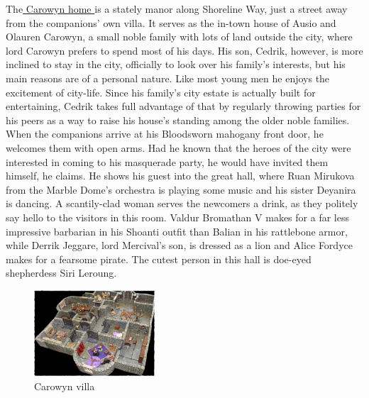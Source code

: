 The\hyperref[fig:Carowyn-villa-486295633]{ Carowyn home } is a stately manor along Shoreline Way, just a street away from the companions' own villa. It serves as the in-town house of Ausio and Olauren Carowyn, a small noble family with lots of land outside the city, where lord Carowyn prefers to spend most of his days. His son, Cedrik, however, is more inclined to stay in the city, officially to look over his family's interests, but his main reasons are of a personal nature. Like most young men he enjoys the excitement of city-life. Since his family's city estate is actually built for entertaining, Cedrik takes full advantage of that by regularly throwing parties for his peers as a way to raise his house's standing among the older noble families. When the companions arrive at his Bloodsworn mahogany front door, he welcomes them with open arms. Had he known that the heroes of the city were interested in coming to his masquerade party, he would have invited them himself, he claims. He shows his guest into the great hall, where Ruan Mirukova from the Marble Dome's orchestra is playing some music and his sister Deyanira is dancing. A scantily-clad woman serves the newcomers a drink, as they politely say hello to the visitors in this room. Valdur Bromathan V makes for a far less impressive barbarian in his Shoanti outfit than Balian in his rattlebone armor, while Derrik Jeggare, lord Mercival's son, is dressed as a lion and Alice Fordyce makes for a fearsome pirate. The cutest person in this hall is doe-eyed shepherdess Siri Leroung. \\

\begin{figure}[h]
	\centering
	\includegraphics[width=0.4\textwidth]{images/Carowyn-villa-486295633_mod.jpg}
	\caption{Carowyn villa}
	\label{fig:Carowyn-villa-486295633}
\end{figure}

